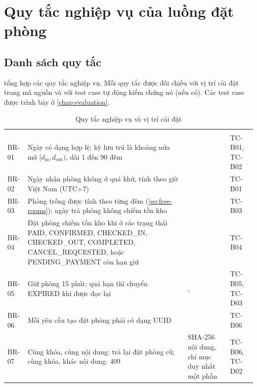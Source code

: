 \section{Quy tắc nghiệp vụ của luồng đặt phòng}\label{sec:booking-rules}

\subsection{Danh sách quy tắc}

 tổng hợp các quy tắc nghiệp vụ. Mỗi quy tắc được đối chiếu với vị trí cài đặt trong mã nguồn và với test case tự động kiểm chứng nó (nếu có). Các test case được trình bày ở \cref{chap:evaluation}.

\begin{rtable}
\begin{longtable}{|C{1.2cm}|L{7.0cm}|L{3.7cm}|L{2.9cm}|}
\caption{Quy tắc nghiệp vụ và vị trí cài đặt}\label{tab:rules}\\
\hline
{} &  &  &  \\ \hline
\endfirsthead
\hline
{} &  &  &  \\ \hline
\endhead
BR-01 & Ngày có dạng  hợp lệ; kỳ lưu trú là khoảng nửa mở $[d_{\text{in}}, d_{\text{out}})$, dài 1 đến 90 đêm &  & TC-B01, TC-B02 \\ \hline
BR-02 & Ngày nhận phòng không ở quá khứ, tính theo giờ Việt Nam (UTC+7) &  & TC-B01 \\ \hline
BR-03 & Phòng trống được tính theo từng đêm (\cref{eq:free-rooms}); ngày trả phòng không chiếm tồn kho &  & TC-B03 \\ \hline
BR-04 & Đặt phòng chiếm tồn kho khi ở các trạng thái PAID, CONFIRMED, CHECKED\_IN, CHECKED\_OUT, COMPLETED, CANCEL\_REQUESTED, hoặc PENDING\_PAYMENT còn hạn giữ &  & TC-B04 \\ \hline
BR-05 & Giữ phòng 15 phút; quá hạn thì chuyển EXPIRED khi được đọc lại & ,  & TC-B05, TC-D03 \\ \hline
BR-06 & Mỗi yêu cầu tạo đặt phòng phải có  dạng UUID &  & TC-B06 \\ \hline
BR-07 & Cùng khóa, cùng nội dung: trả lại đặt phòng cũ; cùng khóa, khác nội dung: 409 & SHA-256 nội dung, chỉ mục duy nhất một phần & TC-B06, TC-D02 \\ \hline

\end{longtable}
\end{rtable}
